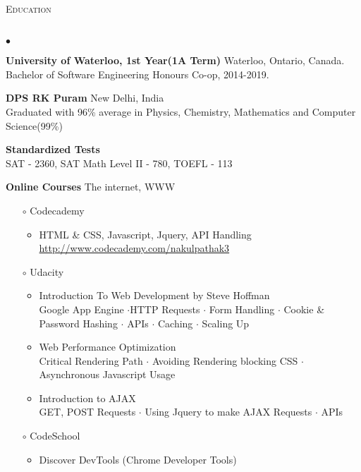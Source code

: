 \documentclass{article}
\newcommand{\lineunder}{\vspace*{-8pt} \\ \hspace*{-18pt} \hrulefill \\}
\newcommand{\header}[1]{{\hspace*{-15pt}\vspace*{6pt} \textsc{#1}} \vspace*{-6pt} \lineunder}
\newenvironment{achievements}{\begin{list}{$\bullet$}{\topsep 0pt \itemsep -1.5pt \leftmargin 5pt}}{\vspace*{4pt}\end{list}}
\begin{document}
\vspace{7pt}

\header{\normalsize Education}
\begin{achievements}
\item \textbf{University of Waterloo, 1st Year(1A Term)} Waterloo, Ontario, Canada. \\ Bachelor of Software Engineering Honours Co-op, 2014-2019. 
\item \textbf{DPS RK Puram} New Delhi, India \\ Graduated with 96\% average in Physics, Chemistry, Mathematics and Computer Science(99\%)
\item \textbf{Standardized Tests} \\ SAT - 2360, SAT Math Level II - 780, TOEFL - 113
\item \textbf{Online Courses} The internet, WWW
\vspace{-4pt}
\begin{itemize}
	\item[$\circ$] Codecademy
	\begin{itemize}
	\vspace{-2pt}
	\item HTML \& CSS, Javascript, Jquery, API Handling 
	\\ \url{http://www.codecademy.com/nakulpathak3}
	\end{itemize}
	\vspace{-3.5pt}
\item[$\circ$] Udacity
	\begin{itemize}
	\vspace{-2pt}
	\item Introduction To Web Development by Steve Hoffman 
	\\  Google App Engine $\cdot$HTTP Requests  $\cdot$ Form Handling $\cdot$ Cookie \& Password Hashing $\cdot$ APIs $\cdot$ Caching $\cdot$ Scaling Up
	\vspace{-2pt}
	\item Web Performance Optimization
	\\ Critical Rendering Path $\cdot$ Avoiding Rendering blocking CSS $\cdot$ Asynchronous Javascript Usage
	\vspace{-2pt}
	\item Introduction to AJAX
	\\ GET, POST Requests $\cdot$ Using Jquery to make AJAX Requests $\cdot$ APIs
	\end{itemize}
	\vspace{-3.5pt}
\item[$\circ$] CodeSchool
	\begin{itemize}
	\vspace{-2pt}
	\item Discover DevTools (Chrome Developer Tools)
	\end{itemize}
	\end{itemize}
\end{achievements}
\end{document}
